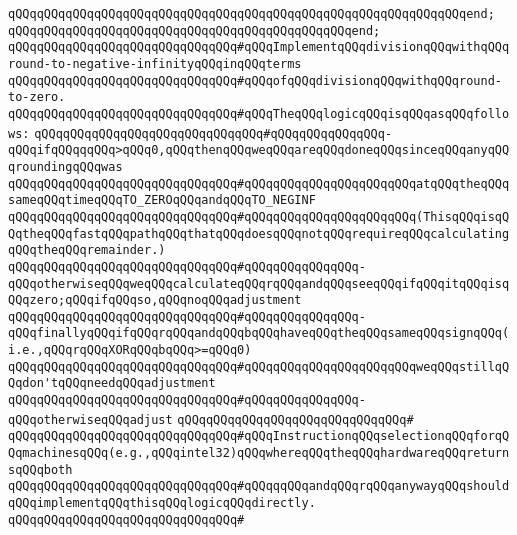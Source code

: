 \verb|qQQqqQQqqQQqqQQqqQQqqQQqqQQqqQQqqQQqqQQqqQQqqQQqqQQqqQQqqQQqqQQqend;|\newline
\verb|qQQqqQQqqQQqqQQqqQQqqQQqqQQqqQQqqQQqqQQqqQQqqQQqend;|\newline
\newline
\newline
\verb|qQQqqQQqqQQqqQQqqQQqqQQqqQQqqQQq#qQQqImplementqQQqdivisionqQQqwithqQQqround-to-negative-infinityqQQqinqQQqterms|\newline
\verb|qQQqqQQqqQQqqQQqqQQqqQQqqQQqqQQq#qQQqofqQQqdivisionqQQqwithqQQqround-to-zero.|\newline
\verb|qQQqqQQqqQQqqQQqqQQqqQQqqQQqqQQq#qQQqTheqQQqlogicqQQqisqQQqasqQQqfollows:|\newline
\verb|qQQqqQQqqQQqqQQqqQQqqQQqqQQqqQQq#qQQqqQQqqQQqqQQq-qQQqifqQQqqqQQq>qQQq0,qQQqthenqQQqweqQQqareqQQqdoneqQQqsinceqQQqanyqQQqroundingqQQqwas|\newline
\verb|qQQqqQQqqQQqqQQqqQQqqQQqqQQqqQQq#qQQqqQQqqQQqqQQqqQQqqQQqatqQQqtheqQQqsameqQQqtimeqQQqTO_ZEROqQQqandqQQqTO_NEGINF|\newline
\verb|qQQqqQQqqQQqqQQqqQQqqQQqqQQqqQQq#qQQqqQQqqQQqqQQqqQQqqQQq(ThisqQQqisqQQqtheqQQqfastqQQqpathqQQqthatqQQqdoesqQQqnotqQQqrequireqQQqcalculatingqQQqtheqQQqremainder.)|\newline
\verb|qQQqqQQqqQQqqQQqqQQqqQQqqQQqqQQq#qQQqqQQqqQQqqQQq-qQQqotherwiseqQQqweqQQqcalculateqQQqrqQQqandqQQqseeqQQqifqQQqitqQQqisqQQqzero;qQQqifqQQqso,qQQqnoqQQqadjustment|\newline
\verb|qQQqqQQqqQQqqQQqqQQqqQQqqQQqqQQq#qQQqqQQqqQQqqQQq-qQQqfinallyqQQqifqQQqrqQQqandqQQqbqQQqhaveqQQqtheqQQqsameqQQqsignqQQq(i.e.,qQQqrqQQqXORqQQqbqQQq>=qQQq0)|\newline
\verb|qQQqqQQqqQQqqQQqqQQqqQQqqQQqqQQq#qQQqqQQqqQQqqQQqqQQqqQQqweqQQqstillqQQqdon'tqQQqneedqQQqadjustment|\newline
\verb|qQQqqQQqqQQqqQQqqQQqqQQqqQQqqQQq#qQQqqQQqqQQqqQQq-qQQqotherwiseqQQqadjust|\newline
\verb|qQQqqQQqqQQqqQQqqQQqqQQqqQQqqQQq#|\newline
\verb|qQQqqQQqqQQqqQQqqQQqqQQqqQQqqQQq#qQQqInstructionqQQqselectionqQQqforqQQqmachinesqQQq(e.g.,qQQqintel32)qQQqwhereqQQqtheqQQqhardwareqQQqreturnsqQQqboth|\newline
\verb|qQQqqQQqqQQqqQQqqQQqqQQqqQQqqQQq#qQQqqqQQqandqQQqrqQQqanywayqQQqshouldqQQqimplementqQQqthisqQQqlogicqQQqdirectly.|\newline
\verb|qQQqqQQqqQQqqQQqqQQqqQQqqQQqqQQq#|\newline
